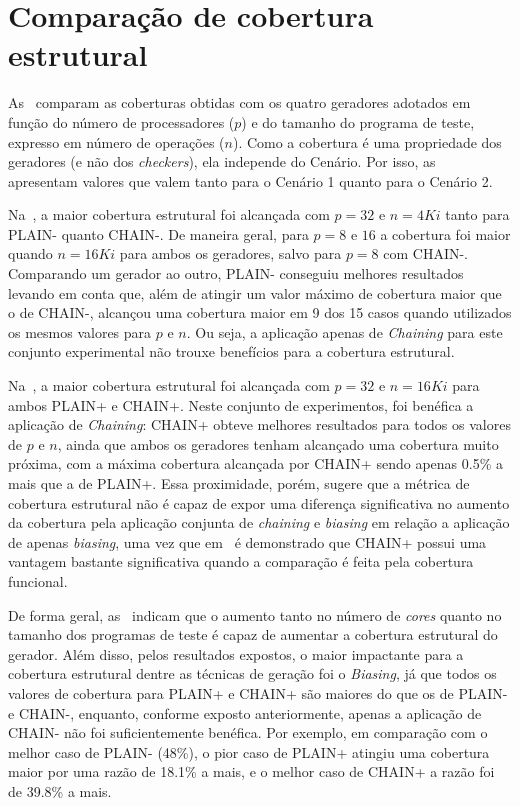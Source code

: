 \section{Comparação de cobertura estrutural}

As~ comparam as coberturas obtidas com os
quatro geradores adotados em função do número de processadores ($p$) e do
tamanho do programa de teste, expresso em número de operações ($n$). Como a
cobertura é uma propriedade dos geradores (e não dos \textit{checkers}), ela
independe do Cenário. Por isso, as~
apresentam valores que valem tanto para o Cenário 1 quanto para o Cenário 2.



Na~, a maior cobertura estrutural foi alcançada com $p =
32$ e $n = 4Ki$ tanto para PLAIN- quanto CHAIN-. De maneira geral, para $p =
\text{8 e 16}$ a cobertura foi maior quando $n = 16Ki$ para ambos os geradores,
salvo para $p = 8$ com CHAIN-. Comparando um gerador ao outro, PLAIN- conseguiu
melhores resultados levando em conta que, além de atingir um valor máximo de
cobertura maior que o de CHAIN-, alcançou uma cobertura maior em 9 dos 15 casos
quando utilizados os mesmos valores para $p$ e $n$.  Ou seja, a aplicação
apenas de \textit{Chaining} para este conjunto experimental não trouxe
benefícios para a cobertura estrutural.



Na~, a maior cobertura estrutural foi alcançada com $p =
32$ e $n = 16Ki$ para ambos PLAIN+ e CHAIN+. Neste conjunto de experimentos,
foi benéfica a aplicação de \textit{Chaining}: CHAIN+ obteve melhores
resultados para todos os valores de $p$ e $n$, ainda que ambos os geradores
tenham alcançado uma cobertura muito próxima, com a máxima cobertura alcançada
por CHAIN+ sendo apenas 0.5\% a mais que a de PLAIN+.  Essa proximidade, porém,
sugere que a métrica de cobertura estrutural não é capaz de expor uma diferença
significativa no aumento da cobertura pela aplicação conjunta de
\textit{chaining} e \textit{biasing} em relação a aplicação de apenas
\textit{biasing}, uma vez que em~\cite{Andrade:2019} é demonstrado que CHAIN+
possui uma vantagem bastante significativa quando a comparação é feita pela
cobertura funcional.

De forma geral, as~ indicam que o aumento
tanto no número de \textit{cores} quanto no tamanho dos programas de teste é
capaz de aumentar a cobertura estrutural do gerador. Além disso, pelos
resultados expostos, o maior impactante para a cobertura estrutural dentre as
técnicas de geração foi o \textit{Biasing}, já que todos os valores de
cobertura para PLAIN+ e CHAIN+ são maiores do que os de PLAIN- e \mbox{CHAIN-,}
enquanto, conforme exposto anteriormente, apenas a aplicação de CHAIN- não foi
suficientemente benéfica. Por exemplo, em comparação com o melhor caso de
PLAIN- (48\%), o pior caso de PLAIN+ atingiu uma cobertura maior por uma razão
de 18.1\% a mais, e o melhor caso de CHAIN+ a razão foi de 39.8\% a mais.

